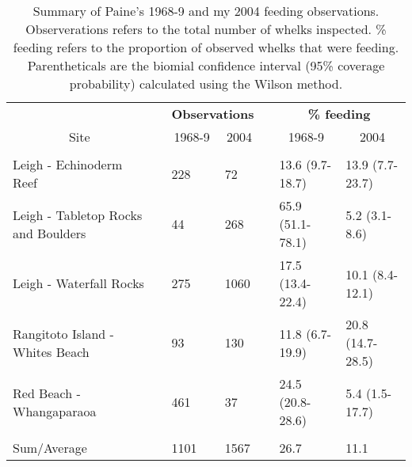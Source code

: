 \begin{table}[!htbp]
\caption{Summary of Paine's 1968-9 and my 2004 feeding observations.  Observerations refers to the total number of whelks inspected. \% feeding refers to the proportion of observed whelks that were feeding. Parentheticals are the biomial confidence interval (95\% coverage probability) calculated using the Wilson method.\label{tab:summ}} 
{\centering
\begin{tabular}{lcllcll}
\hline
\multicolumn{1}{c}{\bfseries }&\multicolumn{1}{c}{\bfseries }&\multicolumn{2}{c}{\bfseries Observations}&\multicolumn{1}{c}{\bfseries }&\multicolumn{2}{c}{\bfseries \% feeding}\tabularnewline
\cline{3-4} \cline{6-7}
\multicolumn{1}{c}{Site}&\multicolumn{1}{c}{}&\multicolumn{1}{c}{1968-9}&\multicolumn{1}{c}{2004}&\multicolumn{1}{c}{}&\multicolumn{1}{c}{1968-9}&\multicolumn{1}{c}{2004}\tabularnewline
\hline
&&&&&&\tabularnewline
Leigh - Echinoderm Reef&&228&72&&13.6 (9.7-18.7)&13.9 (7.7-23.7)\tabularnewline
Leigh - Tabletop Rocks and Boulders&&44&268&&65.9 (51.1-78.1)&5.2 (3.1-8.6)\tabularnewline
Leigh - Waterfall Rocks&&275&1060&&17.5 (13.4-22.4)&10.1 (8.4-12.1)\tabularnewline
Rangitoto Island - Whites Beach&&93&130&&11.8 (6.7-19.9)&20.8 (14.7-28.5)\tabularnewline
Red Beach - Whangaparaoa&&461&37&&24.5 (20.8-28.6)&5.4 (1.5-17.7)\tabularnewline
\hline
&&&&&&\tabularnewline
Sum/Average&&1101&1567&&26.7&11.1\tabularnewline
\hline
\end{tabular}}
\end{table}
